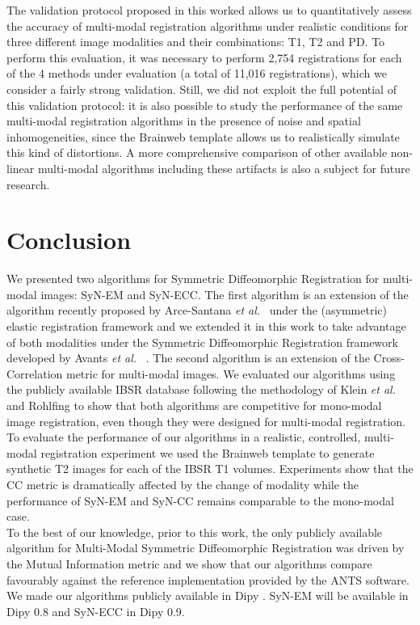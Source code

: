     The validation protocol proposed in this worked allows us to quantitatively assess the accuracy of multi-modal registration algorithms under realistic conditions for three different image modalities and their combinations: T1, T2 and PD. To perform this evaluation, it was necessary to perform 2,754 registrations for each of the 4 methods under evaluation (a total of 11,016 registrations), which we consider a fairly strong validation. Still, we did not exploit the full potential of this validation protocol: it is also possible to study the performance of the same multi-modal registration algorithms in the presence of noise and spatial inhomogeneities, since the Brainweb template allows us to realistically simulate this kind of distortions. A more comprehensive comparison of other available non-linear multi-modal algorithms including these artifacts is also a subject for future research.
    

\section{Conclusion}
We presented two algorithms for Symmetric Diffeomorphic Registration for multi-modal images: SyN-EM and SyN-ECC. The first algorithm is an extension of the algorithm recently proposed by Arce-Santana {\it et al.}~\cite{Arce-santana2014} under the (asymmetric) elastic registration framework and we extended it in this work to take advantage of both modalities under the Symmetric Diffeomorphic Registration framework developed by Avants {\it et al.}~\cite{Avants2008} \cite{Avants2011}. The second algorithm is an extension of the Cross-Correlation metric for multi-modal images. We evaluated our algorithms using the publicly available IBSR database following the methodology of Klein {\it et al.}~\cite{Klein2009} \cite{Klein2010} and
Rohlfing \cite{Rohlfing2012} to show that both algorithms are competitive for mono-modal image registration, even though they were designed for multi-modal registration.
To evaluate the performance of our algorithms in a realistic, controlled, multi-modal registration experiment we used the Brainweb \cite{Cocosco1997}\cite{Kwan1999} template
to generate synthetic T2 images for each of the IBSR T1 volumes. Experiments show that the CC metric is dramatically affected by the change of modality while the performance of
SyN-EM and SyN-CC remains comparable to the mono-modal case.\\

To the best of our knowledge, prior to this work, the only publicly available algorithm for Multi-Modal Symmetric Diffeomorphic Registration was driven by the Mutual Information
metric and we show that our algorithms compare favourably against the reference implementation provided by the ANTS software. We made our algorithms
publicly available in Dipy \cite{Garyfallidis2014}. SyN-EM will be available in Dipy 0.8 and SyN-ECC in Dipy 0.9.
